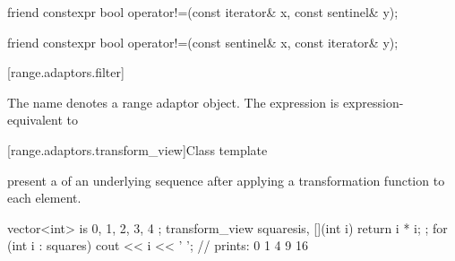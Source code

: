 {\begin{itemdescr}
\pnum
\oldtxt{\returns} 
\end{itemdescr}

%
\begin{itemdecl}
friend constexpr bool operator!=(const iterator& x, const sentinel& y);
\end{itemdecl}

\begin{itemdescr}
\pnum
\oldtxt{\returns} 
\end{itemdescr}

%
\begin{itemdecl}
friend constexpr bool operator!=(const sentinel& x, const iterator& y);
\end{itemdecl}

\begin{itemdescr}
\pnum
\oldtxt{\returns} 
\end{itemdescr}


[range.adaptors.filter]{}

\pnum
The name  denotes a range adaptor
object.  The expression
 
is expression-equivalent to  


[range.adaptors.transform_view]{Class template }

\pnum
{}   present
a  of an underlying sequence after
applying a transformation function to each element.

\pnum
\begin{example}
\begin{codeblock}
vector<int> is{ 0, 1, 2, 3, 4 };
transform_view squares{is, [](int i) { return i * i; }};
for (int i : squares)
  cout << i << ' '; // prints: 0 1 4 9 16
\end{codeblock}
\end{example}

}
